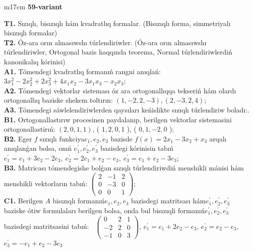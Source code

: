 \documentclass{article}
\begin{document}
\begin{tabular}{m{17cm}}
\textbf{59-variant}
\newline

\textbf{T1.} Sızıqlı, bisızıqlı hám kvadratlıq formalar. (Bisızıqlı forma,  simmetriyalı bisızıqlı formalar)  \\
\textbf{T2.} Óz-ara orın almasıwshı túrlendiriwler. (Óz-ara orın almasıwshı túrlendiriwler,  Ortogonal bazis haqqında teorema,  Normal túrlendiriwlerdiń kanonikalıq kórinisi) \\
\textbf{A1.} Tómendegi kvadratlıq formanıń rangni anıqlań: \(3x_{1}^{2} - 2x_{2}^{2} + 2x_{3}^{2} + 4x_{1}x_{2} - 3x_{1}x_{3} - x_{2}x_{3}\); \\
\textbf{A2.} Tómendegi vektorlar sisteması óz ara ortogonallıqqa tekseriń hám olardı ortogonallıq baziske shekem toltırın: \((1, - 2,2, - 3),(2, - 3,2,4)\); \\
\textbf{A3.} Tómendegi sáwlelendiriwlerden qaysıları keńislikte sızıqlı túrlendiriw boladı:. \\
\textbf{B1.} Ortogonallastırıw procesinen paydalanıp, berilgen vektorlar sistemasini ortogonallastirıń: \((2,0,1,1)\), ( \(1,2,0,1\) ), ( \(0,1, - 2,0\) ); \\
\textbf{B2.} Eger \(f\) sızıqlı funkciya\(e_{1},e_{2},e_{3}\) bazisde \(f(x) = 2x_{1} - 3x_{2} + x_{3}\) arqalı anıqlanǵan bolsa, onıń \(e_{1}^{'},e_{2}^{'},e_{3}^{'}\) bazisdegi kórinisin tabıń\(e_{1}^{'} = e_{1} + 3e_{2} - 2e_{3},\ e_{2}^{'} = 2e_{1} + e_{2} - e_{3},\ e_{3}^{'} = e_{1} + e_{2} - 3e_{3}\); \\
\textbf{B3.} Matricası tómendegishe bolǵan sızıqlı túrlendiriwdiń menshikli mánisi hám menshikli vektorların tabıń: \(\begin{pmatrix} 2 & - 1 & 2 \\ 0 & - 3 & 0 \\ 0 & 0 & 1 \end{pmatrix}\); \\
\textbf{C1.} Berilgen \(A\) bisızıqlı formanıń\(e_{1},e_{2},e_{3}\) bazisdegi matritsası hám\(e_{1}^{'},e_{2}^{'},e_{3}^{'}\) baziske ótiw formulaları berilgen bolsa, onda bul bisızıqli formanıń\(e_{1}^{'},e_{2}^{'},e_{3}^{'}\) bazisdegi matritsasini tabıń: \(\ \) \(\begin{pmatrix} 0 & 2 & 1 \\  - 2 & 2 & 0 \\  - 1 & 0 & 3 \end{pmatrix}\), \(e_{1}^{'} = e_{1} + 2e_{2} - e_{3}\), \(e_{2}^{'} = e_{2} - e_{3}\), \(e_{3}^{'} = - e_{1} + e_{2} - 3e_{3}\) \\

\end{tabular}
\end{document}
